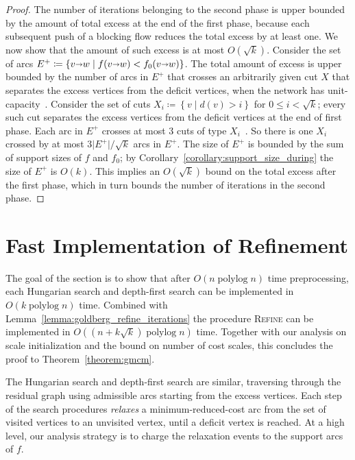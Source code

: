 \documentclass[a4paper,UKenglish]{socg-lipics-v2018}
\makeatletter
\def\polylog{\mathop{\mathrm{polylog}}}
\def\abs#1{\mathopen| #1 \mathclose|}		%
\def\Set#1{\left\{ #1 \right\}}
\def\arcto{\mathord\shortrightarrow}
\def\arc#1#2{#1\arcto#2}
\theoremstyle{plain}
\numberwithin{figure}{section}
\def\EMPH#1{\textcolor{BrickRed}{{\emph{#1}}}}
\def\n@te#1{\textsf{\boldmath \textbf{$\langle\!\langle$#1$\rangle\!\rangle$}}\leavevmode}
\def\note#1{\textcolor{red}{\n@te{#1}}}
\renewcommand{\note}[1]{} %
\makeatother
\begin{document}
\begin{proof}
The number of iterations
belonging to the second phase is upper bounded by the amount of total excess at the end of the first phase, because each subsequent push of a blocking flow reduces the total excess by at least one.  We now show that the amount of such excess is at most $O(\sqrt{k})$.
%
Consider the set of arcs $E^+ \coloneqq \Set{\arc vw \mid f(\arc vw) < f_0(\arc vw)}$.
The total amount of excess is upper bounded by the number of arcs in $E^+$ that crosses an arbitrarily given cut $X$ that separates the excess vertices from the deficit vertices, when the network has unit-capacity~\cite[Lemma~3.6]{GHKT17}.
%
Consider the set of cuts $X_i \coloneqq \Set{v \mid d(v) > i}$ for $0 \le i < \sqrt{k}$; every such cut separates the excess vertices from the deficit vertices at the end of first phase.
Each arc in $E^+$ crosses at most $3$ cuts of type $X_i$~\cite[Lemma~3.1]{GHKT17}.  So there is one $X_i$ crossed by at most $3\abs{E^+}/\sqrt{k}$ arcs in $E^+$.
%
The size of $E^+$ is bounded by the sum of support sizes of $f$ and $f_0$; by Corollary~\ref{corollary:support_size_during} the size of $E^+$ is $O(k)$.
This implies an $O(\sqrt{k})$ bound on the total excess after the first phase, which in turn bounds the number of iterations in the second phase.
\end{proof}


\section{Fast Implementation of Refinement}
\label{S:implementation}

The goal of the section is to show that after $O(n \polylog n)$ time preprocessing, each Hungarian search and depth-first search can be implemented in $O(k \polylog n)$ time.
%
Combined with Lemma~\ref{lemma:goldberg_refine_iterations}
the procedure \textsc{Refine} can be implemented in $O((n+k\sqrt{k}) \polylog n)$ time.  Together with our analysis on scale initialization and the bound on number of cost scales, this concludes the proof to Theorem~\ref{theorem:gmcm}.

The Hungarian search and depth-first search are similar, traversing through the residual graph using admissible arcs starting from the excess vertices.
Each step of the search procedures \EMPH{relaxes} a minimum-reduced-cost arc from the set of visited vertices to an unvisited vertex, until a deficit vertex is reached.
%
At a high level, our analysis strategy is to charge the relaxation events to the support arcs of $f$.
\end{document}
